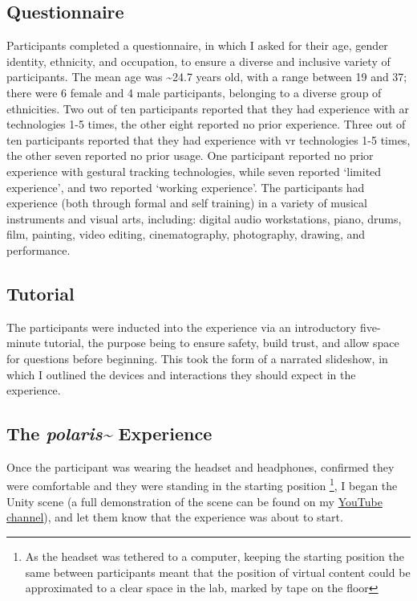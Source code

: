 \subsection{Questionnaire}\label{sec: polaris-study-questionnaire}
Participants completed a questionnaire, in which I asked for their age, gender identity, ethnicity, and occupation, to ensure a diverse and inclusive variety of participants. The mean age was \textasciitilde{}24.7 years old, with a range between 19 and 37; there were 6 female and 4 male participants, belonging to a diverse group of ethnicities. Two out of ten participants reported that they had experience with \gls{ar} technologies 1-5 times, the other eight reported no prior experience. Three out of ten participants reported that they had experience with \gls{vr} technologies 1-5 times, the other seven reported no prior usage. One participant reported no prior experience with gestural tracking technologies, while seven reported `limited experience', and two reported `working experience'. The participants had experience (both through formal and self training) in a variety of musical instruments and visual arts, including: digital audio workstations, piano, drums, film, painting, video editing, cinematography, photography, drawing, and performance.

\subsection{Tutorial}\label{sec: polaris-study-tutorial}
The participants were inducted into the experience via an introductory five-minute tutorial, the purpose being to ensure safety, build trust, and allow space for questions before beginning. This took the form of a narrated slideshow, in which I outlined the devices and interactions they should expect in the experience.

\subsection{The \textit{polaris\textasciitilde{}} Experience}\label{sec: polaris-study-experience}
Once the participant was wearing the headset and headphones, confirmed they were comfortable and they were standing in the starting position \footnote{As the headset was tethered to a computer, keeping the starting position the same between participants meant that the position of virtual content could be approximated to a clear space in the lab, marked by tape on the floor}, I began the Unity scene (a full demonstration of the scene can be found on my \href{https://youtu.be/lCBgMs8ULj0}{YouTube channel}), and let them know that the experience was about to start.

